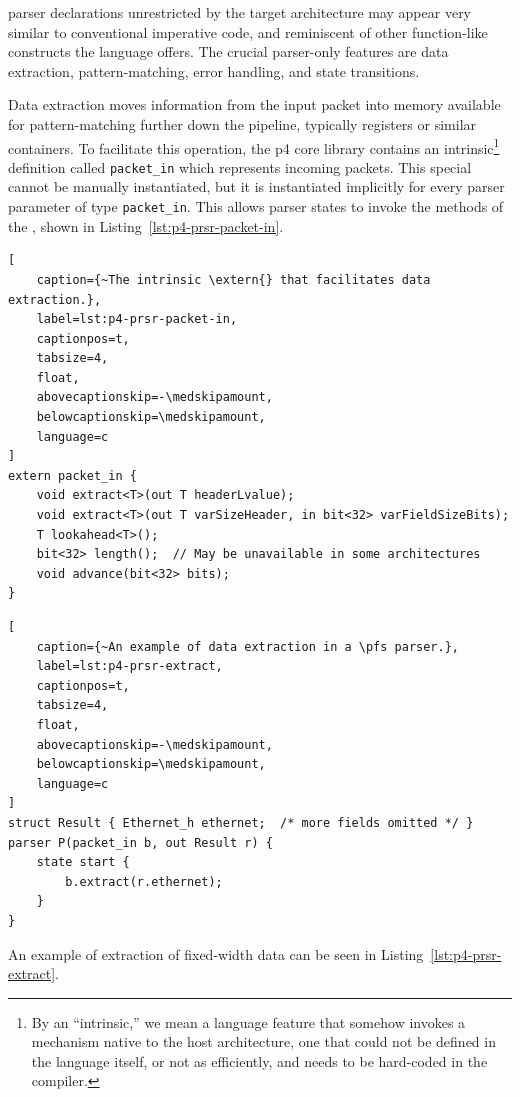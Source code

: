 \pfs parser declarations unrestricted by the target architecture may appear very
similar to conventional imperative code, and reminiscent of other function-like
constructs the language offers. The crucial parser-only features are data
extraction, pattern-matching, error handling, and state transitions.

Data extraction moves information from the input packet into memory available
for pattern-matching further down the pipeline, typically registers or similar
containers. To facilitate this operation, the \acrshort{p4} core library
contains an intrinsic\footnote{By an ``intrinsic,'' we mean a language feature
that somehow invokes a mechanism native to the host architecture, one that could
not be defined in the language itself, or not as efficiently, and needs to be
hard-coded in the compiler.} \extern{} definition called \texttt{packet\_in}
which represents incoming packets. This special \extern{} cannot be manually
instantiated, but it is
instantiated implicitly for every parser parameter of type \texttt{packet\_in}.
This allows parser states to invoke the methods of the \extern{}, shown in
Listing~\ref{lst:p4-prsr-packet-in}.

\begin{lstlisting}[
	caption={~The intrinsic \extern{} that facilitates data extraction.},
	label=lst:p4-prsr-packet-in,
	captionpos=t,
	tabsize=4,
	float,
	abovecaptionskip=-\medskipamount,
	belowcaptionskip=\medskipamount,
	language=c
]
extern packet_in {
	void extract<T>(out T headerLvalue);
	void extract<T>(out T varSizeHeader, in bit<32> varFieldSizeBits);
	T lookahead<T>();
	bit<32> length();  // May be unavailable in some architectures
	void advance(bit<32> bits);
}
\end{lstlisting}

\begin{lstlisting}[
	caption={~An example of data extraction in a \pfs parser.},
	label=lst:p4-prsr-extract,
	captionpos=t,
	tabsize=4,
	float,
	abovecaptionskip=-\medskipamount,
	belowcaptionskip=\medskipamount,
	language=c
]
struct Result { Ethernet_h ethernet;  /* more fields omitted */ }
parser P(packet_in b, out Result r) {
	state start {
		b.extract(r.ethernet);
	}
}
\end{lstlisting}

An example of extraction of fixed-width data can be seen in
Listing~\ref{lst:p4-prsr-extract}.

